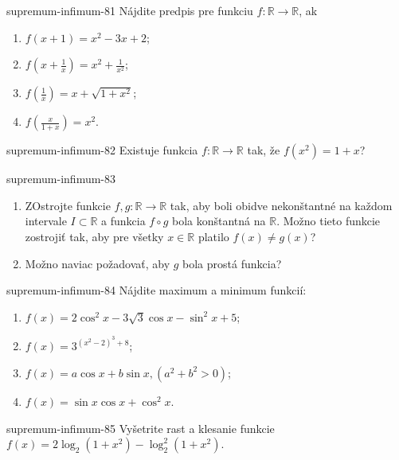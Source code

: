\begin{defproblem}{supremum-infimum-81}
Nájdite predpis pre funkciu $f:\mathbb{R}\rightarrow\mathbb{R}$, ak
\begin{multicols}{2}
\begin{enumerate}
    \item $f(x+1)=x^2-3x+2$;
    \item $f(x+\frac{1}{x})=x^2+\frac{1}{x^2}$;
    \item $f(\frac{1}{x})=x+\sqrt{1+x^2}$;
    \item $f(\frac{x}{1+x})=x^2$.
\end{enumerate}
\end{multicols}
\end{defproblem}

\begin{defproblem}{supremum-infimum-82}
Existuje funkcia $f:\mathbb{R}\rightarrow\mathbb{R}$ tak, že $f(x^2)=1+x$?
\end{defproblem}

\begin{defproblem}{supremum-infimum-83}
\begin{enumerate}
\item ZOstrojte funkcie $f,g:\mathbb{R}\rightarrow\mathbb{R}$ tak, aby boli obidve nekonštantné na každom intervale $I\subset\mathbb{R}$ a funkcia $f\circ g$ bola konštantná na $\mathbb{R}$. Možno tieto funkcie zostrojiť tak, aby pre všetky $x\in\mathbb{R}$ platilo $f(x)\neq g(x)$?
\item Možno naviac požadovať, aby $g$ bola prostá funkcia?
\end{enumerate}
\end{defproblem}

\begin{defproblem}{supremum-infimum-84}
Nájdite maximum a minimum funkcií:
\begin{multicols}{2}
\begin{enumerate}
    \item $f(x)=2\cos^2 x -3\sqrt{3}\cos x -\sin^2 x +5$;
    \item $f(x)=3^{(x^2-2)^3+8}$;
    \item $f(x)=a\cos x +b\sin x ,(a^2+b^2>0)$;
    \item $f(x)=\sin x \cos x +\cos^2 x$.
\end{enumerate}
\end{multicols}
\end{defproblem}

\begin{defproblem}{supremum-infimum-85}
Vyšetrite rast a klesanie funkcie $f(x)=2\log_2(1+x^2)-\log_2^2(1+x^2)$.
\end{defproblem}

